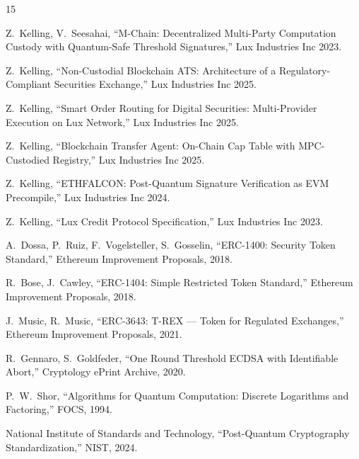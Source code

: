 \begin{thebibliography}{15}

Z.~Kelling, V.~Seesahai,
``M-Chain: Decentralized Multi-Party Computation Custody with Quantum-Safe Threshold Signatures,''
Lux Industries Inc 2023.

Z.~Kelling,
``Non-Custodial Blockchain ATS: Architecture of a Regulatory-Compliant Securities Exchange,''
Lux Industries Inc 2025.

Z.~Kelling,
``Smart Order Routing for Digital Securities: Multi-Provider Execution on Lux Network,''
Lux Industries Inc 2025.

Z.~Kelling,
``Blockchain Transfer Agent: On-Chain Cap Table with MPC-Custodied Registry,''
Lux Industries Inc 2025.

Z.~Kelling,
``ETHFALCON: Post-Quantum Signature Verification as EVM Precompile,''
Lux Industries Inc 2024.

Z.~Kelling,
``Lux Credit Protocol Specification,''
Lux Industries Inc 2023.

A.~Dossa, P.~Ruiz, F.~Vogelsteller, S.~Gosselin,
``ERC-1400: Security Token Standard,''
Ethereum Improvement Proposals, 2018.

R.~Bose, J.~Cawley,
``ERC-1404: Simple Restricted Token Standard,''
Ethereum Improvement Proposals, 2018.

J.~Music, R.~Music,
``ERC-3643: T-REX --- Token for Regulated Exchanges,''
Ethereum Improvement Proposals, 2021.

R.~Gennaro, S.~Goldfeder,
``One Round Threshold ECDSA with Identifiable Abort,''
Cryptology ePrint Archive, 2020.

P.~W.~Shor,
``Algorithms for Quantum Computation: Discrete Logarithms and Factoring,''
FOCS, 1994.

{National Institute of Standards and Technology},
``Post-Quantum Cryptography Standardization,''
NIST, 2024.

\end{thebibliography}

